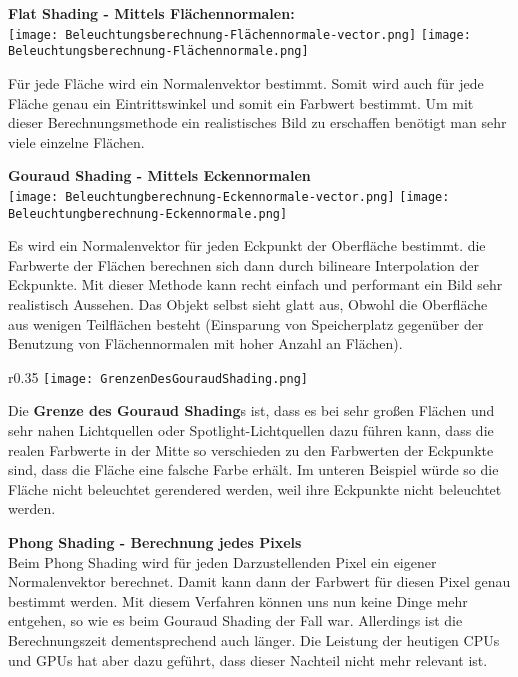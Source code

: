\vspace{10px}
\textbf{Flat Shading - Mittels Flächennormalen:}\\

\texttt{[image: Beleuchtungsberechnung-Flächennormale-vector.png]}
\hspace{15px}
\texttt{[image: Beleuchtungsberechnung-Flächennormale.png]}

Für jede Fläche wird ein Normalenvektor bestimmt. Somit wird auch für jede Fläche genau ein Eintrittswinkel und somit ein Farbwert bestimmt. Um mit dieser Berechnungsmethode ein realistisches Bild zu erschaffen benötigt man sehr viele einzelne Flächen.

\vspace{10px}
\textbf{Gouraud Shading - Mittels Eckennormalen}\\

\texttt{[image: Beleuchtungberechnung-Eckennormale-vector.png]}
\hspace{150px}
\texttt{[image: Beleuchtungberechnung-Eckennormale.png]}

Es wird ein Normalenvektor für jeden Eckpunkt der Oberfläche bestimmt. die Farbwerte der Flächen berechnen sich dann durch bilineare Interpolation der Eckpunkte. Mit dieser Methode kann recht einfach und performant ein Bild sehr realistisch Aussehen. Das Objekt selbst sieht glatt aus, Obwohl die Oberfläche aus wenigen Teilflächen besteht (Einsparung von Speicherplatz gegenüber der Benutzung von Flächennormalen mit hoher Anzahl an Flächen).\\

\begin{wrapfigure}{r}{0.35\textwidth}
    \centering
    \texttt{[image: GrenzenDesGouraudShading.png]}
\end{wrapfigure}

Die \textbf{Grenze des Gouraud Shading}s ist, dass es bei sehr großen Flächen und sehr nahen Lichtquellen oder Spotlight-Lichtquellen dazu führen kann, dass die realen Farbwerte in der Mitte so verschieden zu den Farbwerten der Eckpunkte sind, dass die Fläche eine falsche Farbe erhält. Im unteren Beispiel würde so die Fläche nicht beleuchtet gerendered werden, weil ihre Eckpunkte nicht beleuchtet werden.

\vspace{10px}
\newpage
\textbf{Phong Shading - Berechnung jedes Pixels}\\
Beim Phong Shading wird für jeden Darzustellenden Pixel ein eigener Normalenvektor berechnet. Damit kann dann der Farbwert für diesen Pixel genau bestimmt werden. Mit diesem Verfahren können uns nun keine Dinge mehr entgehen, so wie es beim Gouraud Shading der Fall war. Allerdings ist die Berechnungszeit dementsprechend auch länger. Die Leistung der heutigen CPUs und GPUs hat aber dazu geführt, dass dieser Nachteil nicht mehr relevant ist.